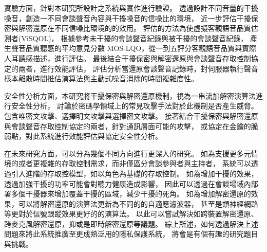     實驗方面，針對本研究所設計之系統與實作進行驗證。
透過設計不同音量的干擾噪音，創造一不同會談聲音內容與干擾噪音的信噪比的環境，
近一步評估干擾保密與解密還原在不同信噪比環境的的效用。
評估的方法為使虛擬客觀語音品質估測者(ViSQOL)，
根據參考未干擾的會談聲音紀錄與被干擾的會談聲音紀錄，
產生聲音品質聽感的平均意見分數 MOS-LQO，從一到五評分客觀語音品質與實際人耳聽感描述，進行評估。
最後結合干擾保密與解密還原與會談聲音存取控制協定的兩者，進行效能評估，
評估分析當還原會談聲音記錄時，封伺服器執行聲音樣本離散時間推估演算法與主動式噪音消除的時間複雜度性。

    安全性分析方面，本研究將干擾保密與解密還原機制，視為一串流加解密演算法進行安全性分析，
討論於密碼學領域上的常見攻擊手法對於此機制是否產生威脅。
包含唯密文攻擊、選擇明文攻擊與選擇密文攻擊。
接著結合干擾保密與解密還原與會談聲音存取控制協定的兩者，針對通訊層面可能的攻擊，
或協定在金鑰的脆弱點，對此系統進行效能評估與協定安全性分析。

    在未來研究方面，可以分為幾個不同方向進行更深入的研究。
如為支援更多元情境的或者更複雜的存取控制需求，而非僅區分會談參與者與主持者，
系統可以透過引入進階的存取控模型，如以角色為基礎的存取控制。
如為增加干擾的效果，透過加強干擾的功率可能會對聽力健康造成影響，
因此可以透過在會談場域內部署多個干擾器來增加覆蓋干擾的區域，減少干擾的死角。
如為增加解密還原的效果，可以將解密還原的演算法更新為不同的的自適應濾波器，
甚至是類神經網路等更對於信號跟蹤效果更好的的演算法。
以此可以嘗試解決如跨裝置解密還原、跨麥克風解密還原，抑或是即時解密還原等議題。
綜上所述，如何透過解決上述問題來將此系統推廣至更成熟泛用的隱私保護系統，
將會是有個有趣的研究題目與挑戰。